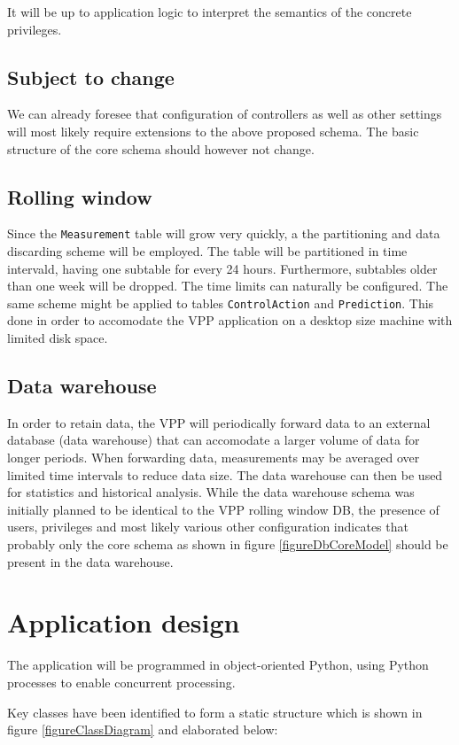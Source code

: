 \documentclass{report}
\begin{document}
It will be up to application logic to interpret the semantics of the concrete privileges.

\subsection{Subject to change}
We can already foresee that configuration of controllers as well as other settings will most likely require extensions to the above proposed schema. The basic structure of the core schema should however not change.

\subsection{Rolling window}\label{subsection:rollingwindow}
Since the \texttt{Measurement} table will grow very quickly, a the partitioning and data discarding scheme will be employed. The table will be partitioned in time intervald, having one subtable for every 24 hours. Furthermore, subtables older than one week will be dropped. The time limits can naturally be configured. The same scheme might be applied to tables \texttt{ControlAction} and \texttt{Prediction}.
This done in order to accomodate the VPP application on a desktop size machine with limited disk space.

\subsection{Data warehouse}
In order to retain data, the VPP will periodically forward data to an external database (data warehouse) that can accomodate a larger volume of data for longer periods. When forwarding data, measurements may be averaged over limited time intervals to reduce data size. The data warehouse can then be used for statistics and historical analysis. While the data warehouse schema was initially planned to be identical to the VPP rolling window DB, the presence of users, privileges and most likely various other configuration indicates that probably only the core schema as shown in figure \ref{figureDbCoreModel} should be present in the data warehouse. 

\section{Application design}
The application will be programmed in object-oriented Python, using Python processes to enable concurrent processing.

Key classes have been identified to form a static structure which is shown in figure \ref{figureClassDiagram} and elaborated below:
\end{document}
